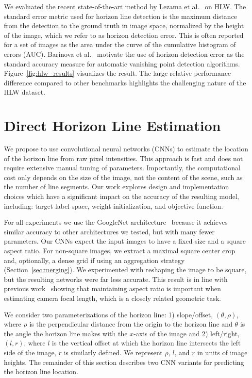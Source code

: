 \documentclass{bmvc2k}
\newcommand{\secref}[1]{Section~\ref{sec:#1}}
\newcommand{\figref}[1]{Figure~\ref{fig:#1}}
\begin{document}
We evaluated the recent state-of-the-art method by Lezama et
al.~\cite{lezama2014finding} on HLW. The standard error metric used
for horizon line detection is the maximum distance from the detection
to the ground truth in image space, normalized by the height of the
image, which we refer to as horizon detection error. This is often
reported for a set of images as the area under the curve of the
cumulative histogram of errors (AUC).  Barinova et
al.~\cite{barinova2010geometric} motivate the use of horizon detection
error as the standard accuracy measure for automatic vanishing point
detection algorithms. \figref{hlw_results} visualizes the result. The
large relative performance difference compared to other benchmarks
highlights the challenging nature of the HLW dataset.  


\section{Direct Horizon Line Estimation}
\label{sec:methods}

We propose to use convolutional neural networks (CNNs) to estimate the
location of the horizon line from raw pixel intensities. This approach
is fast and does not require extensive manual tuning of parameters.
Importantly, the computational cost only depends on the size of the
image, not the content of the scene, such as the number of line
segments. Our work explores design and implementation choices which
have a significant impact on the accuracy of the resulting model,
including: target label space, weight initialization, and objective
function.



For all experiments we use the GoogleNet
architecture~\cite{szegedy2015going} because it achieves similar
accuracy to other architectures we tested, but with many fewer
parameters. Our CNNs expect the input images to have a fixed size and
a square aspect ratio.  For non-square images, we extract a maximal
square center crop and, optionally, a dense
grid if using an aggregation strategy (\secref{merging}). We
experimented with reshaping the image to be square, but the resulting
networks were far less accurate. This result is in line with previous
work~\cite{workman2015deepfocal} showing that maintaining aspect
ratio is important when estimating camera focal length, which is a
closely related geometric task.

We consider two parameterizations of the
horizon line: 1) slope/offset, $(\theta,\rho)$, where $\rho$ is the
perpendicular distance from the origin to the horizon line and
$\theta$ is the angle the horizon line makes with the $x$-axis of the image and 2)
left/right, $(l,r)$, where $l$ is the vertical offset at which the
horizon line intersects the left side of the image, $r$ is similarly
defined. We represent $\rho$, $l$, and $r$ in units of image heights.
The remainder of this section describes two CNN variants for
predicting the horizon line location.
\end{document}
